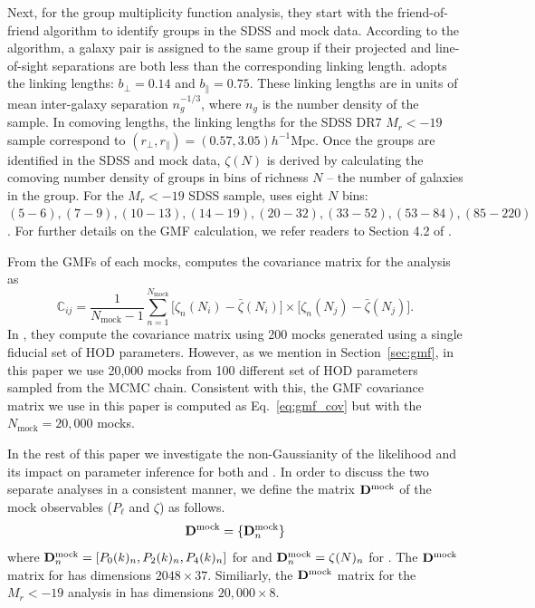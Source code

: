 \documentclass[12pt, letterpaper, preprint]{aastex}
\newcommand{\beq}{\begin{equation}}
\newcommand{\eeq}{\end{equation}}
\newcommand{\Dmock}{{\bf D}^\mathrm{mock}}
\begin{document}
Next, for the \cite{sinha2017a} group multiplicity function analysis, 
they start with the \cite{berlind2006} friend-of-friend algorithm to 
identify groups in the SDSS and mock data. According to the algorithm, a 
galaxy pair is assigned to the same group if their projected and line-of-sight 
separations are both less than the corresponding linking length. \cite{sinha2017a} 
adopts the \cite{berlind2006} linking lengths: $b_\perp = 0.14$ and $b_\parallel = 0.75$.
These linking lengths are in units of  mean inter-galaxy separation 
$n_g^{-1/3}$, where $n_g$ is the number density of the sample. In comoving
lengths, the linking lengths for the SDSS DR7 $M_r < -19$ sample correspond to
$(r_\perp, r_\parallel) = (0.57, 3.05)h^{-1}\mathrm{Mpc}$. 
Once the groups are identified in the SDSS and mock data, $\zeta(N)$
is derived by calculating the comoving number density of groups 
in bins of richness $N$ -- the number of galaxies in the group. 
For the $M_r < −19$ SDSS sample, \cite{sinha2017a} uses eight $N$ bins: 
$(5 - 6), (7 - 9), (10 - 13), (14 - 19), (20 - 32), (33 - 52), (53 - 84), (85 - 220)$.
For further details on the GMF calculation, we refer readers to Section 4.2
of \cite{sinha2017a}. 

From the GMFs of each mocks, \cite{sinha2017a} computes the covariance
matrix for the analysis as 
\beq \label{eq:gmf_cov} 
\mathbb{C}_{ij} = \frac{1}{N_\mathrm{mock} -1} \sum\limits_{n=1}^{N_\mathrm{mock}} \big[\zeta_n(N_i) -  \bar{\zeta}(N_i)\big] \times
    \big[\zeta_n(N_j) -  \bar{\zeta}(N_j)\big].
\eeq
In \cite{sinha2017a}, they compute the covariance matrix using 200 mocks
generated using a single fiducial set of HOD parameters. However, as we 
mention in Section~\ref{sec:gmf}, in this paper we use 20,000 mocks from 
100 different set of HOD parameters sampled from the MCMC chain. Consistent
with this, the GMF covariance matrix we use in this paper is computed as
Eq.~\ref{eq:gmf_cov} but with the $N_\mathrm{mock} = 20,000$ mocks. 

In the rest of this paper we investigate the non-Gaussianity of the 
likelihood and its impact on parameter inference for both \cite{beutler2017} 
and \cite{sinha2017a}. In order to discuss the two separate analyses
in a consistent manner, we define the matrix $\Dmock$ of 
the mock observables ($P_\ell$ and $\zeta$) as follows. 
\beq
\Dmock = \{{\bf D}^\mathrm{mock}_n\}
\eeq
where $\Dmock_n = [P_0(k)_n,P_2(k)_n,P_4(k)_n]$ for 
\cite{beutler2017} and $\Dmock_n = \zeta(N)_n$ for 
\cite{sinha2017a}. The $\Dmock$ matrix for \cite{beutler2017} has dimensions
$2048 \times 37$. Similiarly, the $\Dmock$ matrix for the $M_r < -19$ 
analysis in \cite{sinha2017a} has dimensions $20,000 \times 8$. 
\end{document}
